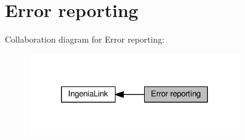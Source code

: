 \hypertarget{group__IL__ERR}{}\section{Error reporting}
\label{group__IL__ERR}
Collaboration diagram for Error reporting\+:\nopagebreak
\begin{figure}[H]
\begin{center}
\leavevmode
\includegraphics[width=260pt]{group__IL__ERR}
\end{center}
\end{figure}
